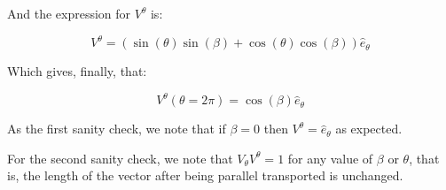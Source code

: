 \documentclass{article}
\begin{document}
And the expression for $V^{\theta}$ is:

\begin{equation}
V^{\theta}=\left(\sin(\theta)\sin(\beta)+\cos(\theta)\cos(\beta)\right)\hat{e}_{\theta}
\end{equation}

Which gives, finally, that:

\begin{equation}
V^{\theta}\left(\theta=2\pi\right)=\cos(\beta)\hat{e}_{\theta}
\end{equation}

As the first sanity check, we note that if $\beta=0$ then $V^{\theta}=\hat{e}_{\theta}$ as expected.

For the second sanity check, we note that $V_{\theta}V^{\theta}=1$ for any value of $\beta$ or $\theta$, that is, the length of the vector after being parallel transported is unchanged.
\end{document}
